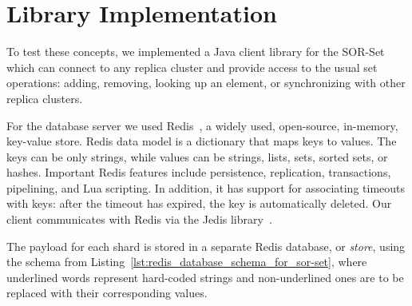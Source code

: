 \section{Library Implementation}
\label{sec:library_implementation}

To test these concepts, we implemented a Java client library for the SOR-Set
which can connect to any replica cluster and provide access to the usual set
operations: adding, removing, looking up an element, or synchronizing with other
replica clusters.

For the database server we used Redis~\cite{redis}, a widely used, open-source,
in-memory, key-value store. Redis data model is a dictionary that maps keys to
values. The keys can be only strings, while values can be strings, lists, sets,
sorted sets, or hashes. Important Redis features include persistence,
replication, transactions, pipelining, and Lua scripting. In addition, it has
support for associating timeouts with keys: after the timeout has expired, the
key is automatically deleted. Our client communicates with Redis via the
Jedis library~\cite{jedis}.

The payload for each shard is stored in a separate Redis database, or
\textit{store}, using the schema from
Listing~\ref{lst:redis_database_schema_for_sor-set}, where underlined words
represent hard-coded strings and non-underlined ones are to be replaced with
their corresponding values.

